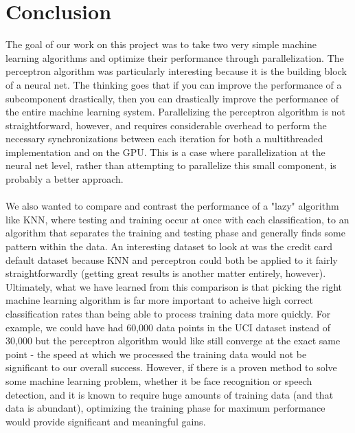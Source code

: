 \documentclass{article}
\begin{document}
\section{Conclusion}
The goal of our work on this project was to take two very simple machine learning algorithms and optimize their performance through parallelization. The perceptron algorithm was particularly interesting because it is the building block of a neural net. The thinking goes that if you can improve the performance of a subcomponent drastically, then you can drastically improve the performance of the entire machine learning system. Parallelizing the perceptron algorithm is not straightforward, however, and requires considerable overhead to perform the necessary synchronizations between each iteration for both a multithreaded implementation and on the GPU. This is a case where parallelization at the neural net level, rather than attempting to parallelize this small component, is probably a better approach. \\
\\
We also wanted to compare and contrast the performance of a "lazy" algorithm like KNN, where testing and training occur at once with each classification, to an algorithm that separates the training and testing phase and generally finds some pattern within the data. An interesting dataset to look at was the credit card default dataset because KNN and perceptron could both be applied to it fairly straightforwardly (getting great results is another matter entirely, however). Ultimately, what we have learned from this comparison is that picking the right machine learning algorithm is far more important to acheive high correct classification rates than being able to process training data more quickly. For example, we could have had 60,000 data points in the UCI dataset instead of 30,000 but the perceptron algorithm would like still converge at the exact same point - the speed at which we processed the training data would not be significant to our overall success. However, if there is a proven method to solve some machine learning problem, whether it be face recognition or speech detection, and it is known to require huge amounts of training data (and that data is abundant), optimizing the training phase for maximum performance would provide significant and meaningful gains. \\
\end{document}
